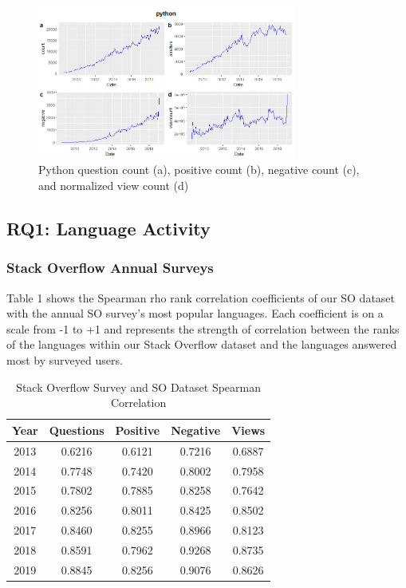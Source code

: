 \documentclass[conference]{IEEEtran}
\begin{document}
\begin{figure}[h]
\includegraphics[width=8.5cm]{python.png}
\centering
\caption{Python question count (a), positive count (b), negative count (c), and normalized view count (d)}
\end{figure}


\subsection{RQ1: Language Activity}

\subsubsection{Stack Overflow Annual Surveys}

Table 1 shows the Spearman rho rank correlation coefficients of our SO dataset with the annual SO survey's most popular languages. Each coefficient is on a scale from -1 to +1 and represents the strength of correlation between the ranks of the languages within our Stack Overflow dataset and the languages answered most by surveyed users.

\begin{table}[htbp]
\caption{Stack Overflow Survey and SO Dataset Spearman Correlation}
\begin{center}
\begin{tabular}{|c|c|c|c|c|}
\hline
\textbf{Year} & \textbf{Questions} & \textbf{Positive} & \textbf{Negative} & \textbf{Views} \\
\hline
 2013 & 0.6216 & 0.6121 & 0.7216 & 0.6887 \\
 \hline
 2014 & 0.7748 & 0.7420 & 0.8002 & 0.7958 \\
 \hline
 2015 & 0.7802 & 0.7885 & 0.8258 & 0.7642 \\
 \hline
 2016 & 0.8256 & 0.8011 & 0.8425 & 0.8502 \\
 \hline
 2017 & 0.8460 & 0.8255 & 0.8966 & 0.8123 \\
 \hline
 2018 & 0.8591 & 0.7962 & 0.9268 & 0.8735 \\
 \hline
 2019 & 0.8845 & 0.8256 & 0.9076 & 0.8626 \\
 \hline
\end{tabular}
\label{tab1}
\end{center}
\end{table}
\end{document}

